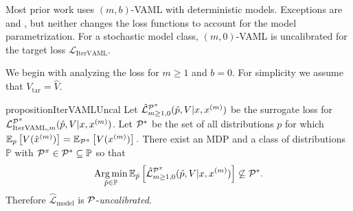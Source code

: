 Most prior work uses $(m,b)$-VAML with deterministic models.
Exceptions are \textcite{voelcker2022value} and \textcite{antonoglou2022planning}, but neither changes the loss functions to account for the model parametrization.
For a stochastic model class, $(m,0)$-VAML is uncalibrated for the target loss $\mathcal{L}_\mathrm{IterVAML}$.

We begin with analyzing the loss for $m\geq1$ and $b=0$.
For simplicity we assume that $V_\mathrm{tar} = \hat{V}$.
\begin{restatable}{proposition}{IterVAMLUncal}\label{prop:cvaml:2_1}
    Let $\hat{\mathcal{L}}^{\P^\pi}_{m\geq1,0}(\hat{p},V|x,x^{(m)})$ be the surrogate loss for $\mathcal{L}_{\mathrm{IterVAML}, m}^{\P^\pi}(\hat{p}, V|x, x^{(m)})$.
    Let $\P^*$ be the set of all distributions $p$ for which $\EEX{p}{V(\hat{x}^{(m)})} = \EEX{\P^\pi}{V(x^{(m)})}.$
    There exist an MDP and a class of distributions $\mathbb{P}$ with $\P^\pi \in \P^* \subseteq \mathbb{P}$ so that $$\Argmin_{\hat{p} \in \mathbb{P}} \mathbb{E}_{\hat{p}}\left[\hat{\mathcal{L}}^{\P^\pi}_{m\geq1,0}(\hat{p},V|x,x^{(m)})\right] \not\subseteq \P^*.$$
    Therefore $\hat{\mathcal{L}}_\mathrm{model}$ is $\P$-\emph{uncalibrated}.
\end{restatable}
